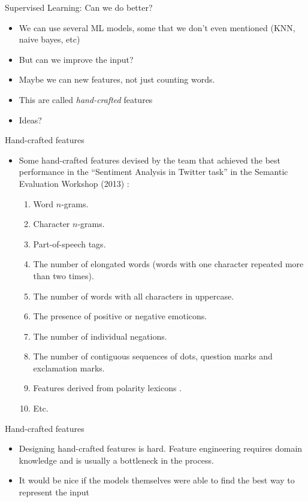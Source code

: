\documentclass[10pt]{beamer}
\begin{document}
\begin{frame}{Supervised Learning: Can we do better?}
\begin{itemize}

\item We can use several ML models, some that we don't even mentioned (KNN, naive bayes, etc)

\item But can we improve the input?

\item Maybe we can new features, not just counting words. 

\item This are called \textit{hand-crafted} features

\item Ideas?
\end{itemize}
\end{frame}

\begin{frame}{Hand-crafted features}
\begin{itemize}
\item Some hand-crafted features devised by the team that achieved the best performance \cite{Mohammad2013} in the ``Sentiment Analysis in Twitter task'' in the Semantic Evaluation Workshop (2013) \cite{Semeval2013}:
\begin{enumerate}

\item Word $n$-grams.
\item Character $n$-grams. 
\item Part-of-speech tags.

\item The number of elongated words (words with one character repeated more than two times).
\item The number of words with all characters in uppercase.
\item The presence of positive or negative emoticons.
\item The number of individual negations.
\item The number of contiguous sequences of dots, question marks and exclamation marks.
\item Features derived from polarity lexicons \cite{Mohammad2013}. 
\item Etc.
\end{enumerate}
\end{itemize}
\end{frame}

\begin{frame}{Hand-crafted features}
\begin{itemize}
\item Designing hand-crafted features is hard. Feature engineering requires domain knowledge and is usually a bottleneck in the process.
\item It would be nice if the models themselves were able to find the best way to represent the input   
\end{itemize}
\end{frame}
\end{document}
